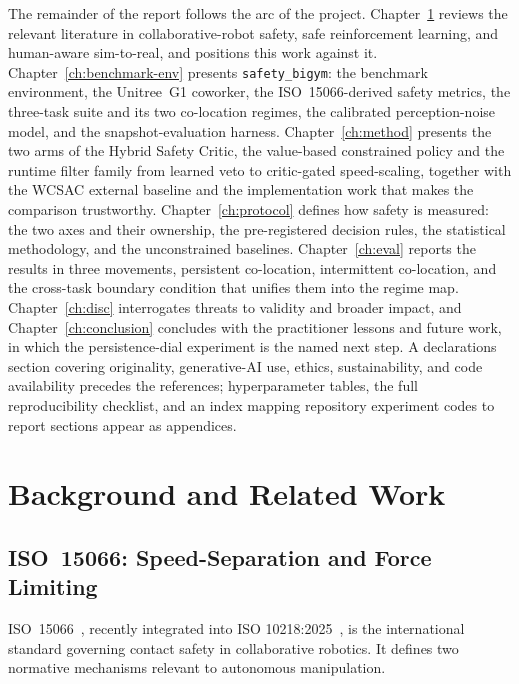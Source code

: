 \documentclass[11pt,a4paper]{report}
\newcommand{\iso}{ISO~15066}
\newcommand{\sbigym}{\texttt{safety\_bigym}}
\begin{document}
The remainder of the report follows the arc of the project.
Chapter~\ref{ch:background} reviews the relevant literature in
collaborative-robot safety, safe reinforcement learning, and
human-aware sim-to-real, and positions this work against it.
Chapter~\ref{ch:benchmark-env} presents \sbigym{}: the benchmark
environment, the Unitree~G1 coworker, the \iso{}-derived safety
metrics, the three-task suite and its two co-location regimes, the
calibrated perception-noise model, and the snapshot-evaluation
harness. Chapter~\ref{ch:method} presents the two arms of the Hybrid
Safety Critic, the value-based constrained policy and the runtime
filter family from learned veto to critic-gated speed-scaling,
together with the WCSAC external baseline and the implementation
work that makes the comparison trustworthy.
Chapter~\ref{ch:protocol} defines how safety is measured: the two
axes and their ownership, the pre-registered decision rules, the
statistical methodology, and the unconstrained baselines.
Chapter~\ref{ch:eval} reports the results in three movements,
persistent co-location, intermittent co-location, and the cross-task
boundary condition that unifies them into the regime map.
Chapter~\ref{ch:disc} interrogates threats to validity and broader
impact, and Chapter~\ref{ch:conclusion} concludes with the
practitioner lessons and future work, in which the persistence-dial
experiment is the named next step. A declarations section covering
originality, generative-AI use, ethics, sustainability, and code
availability precedes the references; hyperparameter tables, the
full reproducibility checklist, and an index mapping repository
experiment codes to report sections appear as appendices.


\chapter{Background and Related Work}
\label{ch:background}

\section{\iso{}: Speed-Separation and Force Limiting}
\label{sec:bg:iso}

\iso{}~\cite{iso15066}, recently integrated into ISO
10218:2025~\cite{iso10218,hartmann2026iso}, is the international standard governing
contact safety in collaborative robotics. It defines two normative
mechanisms relevant to autonomous manipulation.
\end{document}
